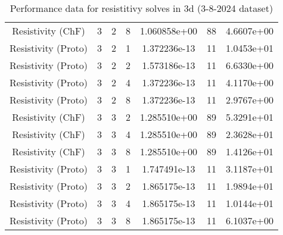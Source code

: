 \documentclass{article}
\begin{document}
\begin{small}
\begin{table}
\begin{center}
\begin{tabular}{|c|c|c|c|c|c||c|}
        Resistivity      (ChF) & 3 & 2 & 8& 1.060858e+00 & 88 & 4.6607e+00\\
        Resistivity    (Proto) & 3 & 2 & 1& 1.372236e-13 & 11 & 1.0453e+01\\
        Resistivity    (Proto) & 3 & 2 & 2& 1.573186e-13 & 11 & 6.6330e+00\\
        Resistivity    (Proto) & 3 & 2 & 4& 1.372236e-13 & 11 & 4.1170e+00\\
        Resistivity    (Proto) & 3 & 2 & 8& 1.372236e-13 & 11 & 2.9767e+00\\
        \hline 
        Resistivity      (ChF) & 3 & 3 & 2& 1.285510e+00 & 89 & 5.3291e+01\\
        Resistivity      (ChF) & 3 & 3 & 4& 1.285510e+00 & 89 & 2.3628e+01\\
        Resistivity      (ChF) & 3 & 3 & 8& 1.285510e+00 & 89 & 1.4126e+01\\
        Resistivity    (Proto) & 3 & 3 & 1& 1.747491e-13 & 11 & 3.1187e+01\\
        Resistivity    (Proto) & 3 & 3 & 2& 1.865175e-13 & 11 & 1.9894e+01\\
        Resistivity    (Proto) & 3 & 3 & 4& 1.865175e-13 & 11 & 1.0144e+01\\
        Resistivity    (Proto) & 3 & 3 & 8& 1.865175e-13 & 11 & 6.1037e+00\\
        \hline 
      \end{tabular} 
    \end{center}   
    \label{tab::datareductiontable3102024.resist_3} 
    \caption{Performance data for  resistitivy solves in 3d (3-8-2024 dataset)}
  \end{table} 
\end{small} 





\end{document}
